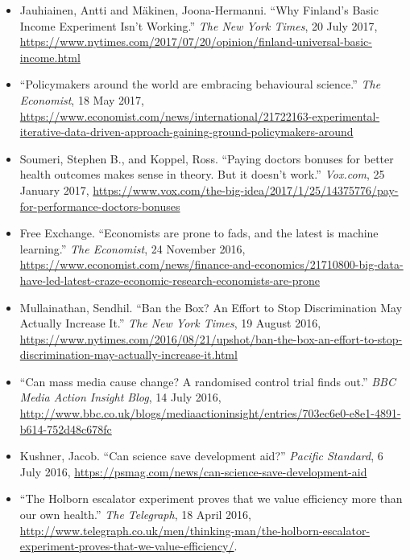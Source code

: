 \documentclass[12pt,a4paper]{article}
\begin{document}
\begin{itemize}
\item Jauhiainen, Antti and M\"{a}kinen, Joona-Hermanni. ``Why Finland's Basic Income Experiment Isn't Working.'' \textit{The New York Times}, 20 July 2017, \url{https://www.nytimes.com/2017/07/20/opinion/finland-universal-basic-income.html}

\item ``Policymakers around the world are embracing behavioural science.'' \textit{The Economist}, 18 May 2017, \url{https://www.economist.com/news/international/21722163-experimental-iterative-data-driven-approach-gaining-ground-policymakers-around}

\item Soumeri, Stephen B., and Koppel, Ross. ``Paying doctors bonuses for better health outcomes makes sense in theory. But it doesn't work.'' \textit{Vox.com}, 25 January 2017, \url{https://www.vox.com/the-big-idea/2017/1/25/14375776/pay-for-performance-doctors-bonuses}

\item Free Exchange. ``Economists are prone to fads, and the latest is machine learning.'' \textit{The Economist}, 24 November 2016, \url{https://www.economist.com/news/finance-and-economics/21710800-big-data-have-led-latest-craze-economic-research-economists-are-prone}

\item Mullainathan, Sendhil. ``Ban the Box? An Effort to Stop Discrimination May Actually Increase It.'' \textit{The New York Times}, 19 August 2016, \url{https://www.nytimes.com/2016/08/21/upshot/ban-the-box-an-effort-to-stop-discrimination-may-actually-increase-it.html}

\item ``Can mass media cause change? A randomised control trial finds out.'' \textit{BBC Media Action Insight Blog}, 14 July 2016, \url{http://www.bbc.co.uk/blogs/mediaactioninsight/entries/703ec6e0-e8e1-4891-b614-752d48c678fc}

\item Kushner, Jacob. ``Can science save development aid?'' \textit{Pacific Standard}, 6 July 2016, \url{ https://psmag.com/news/can-science-save-development-aid}

\item ``The Holborn escalator experiment proves that we value efficiency more than our own health.'' \textit{The Telegraph}, 18 April 2016, \url{http://www.telegraph.co.uk/men/thinking-man/the-holborn-escalator-experiment-proves-that-we-value-efficiency/}.


\end{itemize}
\end{document}
